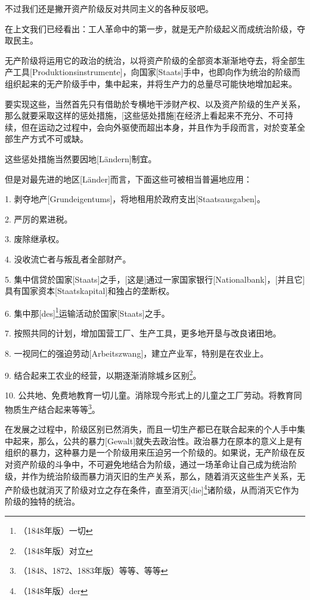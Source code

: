 \documentclass[a4paper,12pt]{ctexart}
\begin{document}

不过我们还是撇开资产阶级反对共同主义的各种反驳吧。

在上文我们已经看出：工人革命中的第一步，就是无产阶级起义而成统治阶级，夺取民主。

无产阶级将运用它的政治的统治，以将资产阶级的全部资本渐渐地夺去，将全部生产工具[Produktionsinstrumente]，向国家[Staats]手中，也即向作为统治的阶级而组织起来的无产阶级手中，集中起来，并将生产力的总量尽可能快地增加起来。

要实现这些，当然首先只有借助於专横地干涉财产权、以及资产阶级的生产关系，那么就要采取这样的惩处措施，[这些惩处措施]在经济上看起来不充分、不可持续，但在运动之过程中，会向外驱使而超出本身，并且作为手段而言，对於变革全部生产方式不可或缺。

这些惩处措施当然要因地[Ländern]制宜。

但是对最先进的地区[Länder]而言，下面这些可被相当普遍地应用：


1. 剥夺地产[Grundeigentums]，将地租用於政府支出[Staatsausgaben]。

2. 严厉的累进税。

3. 废除继承权。

4. 没收流亡者与叛乱者全部财产。

5. 集中信贷於国家[Staats]之手，[这是]通过一家国家银行[Nationalbank]，[并且它]具有国家资本[Staatskapital]和独占的垄断权。

6. 集中那[des]\footnote{（1848年版）一切}运输活动於国家[Staats]之手。

7. 按照共同的计划，增加国营工厂、生产工具，更多地开垦与改良诸田地。

8. 一视同仁的强迫劳动[Arbeitszwang]，建立产业军，特别是在农业上。

9. 结合起来工农业的经营，以期逐渐消除城乡区别\footnote{（1848年版）对立}。

10. 公共地、免费地教育一切儿童。消除现今形式上的儿童之工厂劳动。将教育同物质生产结合起来等等\footnote{（1848、1872、1883年版）等等、等等}。

在发展之过程中，阶级区别已然消失，而且一切生产都已在联合起来的个人手中集中起来，那么，公共的暴力[Gewalt]就失去政治性。政治暴力在原本的意义上是有组织的暴力，这种暴力是一个阶级用来压迫另一个阶级的。如果说，无产阶级在反对资产阶级的斗争中，不可避免地结合为阶级，通过一场革命让自己成为统治阶级，并作为统治阶级而暴力消灭旧的生产关系，那么，随着消灭这些生产关系，无产阶级也就消灭了阶级对立之存在条件，直至消灭[die]\footnote{（1848年版）der}诸阶级，从而消灭它作为阶级的独特的统治。
\end{document}

